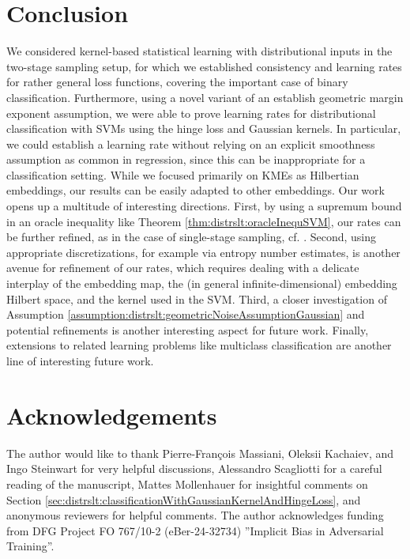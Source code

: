 \documentclass[letterpaper]{article} %
\begin{document}
\section{Conclusion}
We considered kernel-based statistical learning with distributional inputs in the two-stage sampling setup, for which we established consistency and learning rates for rather general loss functions, covering the important case of binary classification.
Furthermore, using a novel variant of an establish geometric margin exponent assumption, we were able to prove learning rates for distributional classification with SVMs using the hinge loss and Gaussian kernels. 
In particular, we could establish a learning rate without relying on an explicit smoothness assumption as common in regression, since this can be inappropriate for a classification setting.
While we focused primarily on KMEs as Hilbertian embeddings, our results can be easily adapted to other embeddings.
Our work opens up a multitude of interesting directions.
First, by using a supremum bound in an oracle inequality like Theorem \ref{thm:distrslt:oracleInequSVM}, our rates can be further refined, as in the case of single-stage sampling, cf. \cite[Chapter~7]{SC08}.
Second, using appropriate discretizations, for example via entropy number estimates, is another avenue for refinement of our rates, which requires dealing with a delicate interplay of the embedding map, the (in general infinite-dimensional) embedding Hilbert space, and the kernel used in the SVM.
Third, a closer investigation of Assumption \ref{assumption:distrslt:geometricNoiseAssumptionGaussian} and potential refinements is another interesting aspect for future work.
Finally, extensions to related learning problems like multiclass classification are another line of interesting future work.
\clearpage

\onecolumn

\section*{Acknowledgements}
The author would like to thank Pierre-François Massiani, Oleksii Kachaiev, and Ingo Steinwart for very helpful discussions, Alessandro Scagliotti for a careful reading of the manuscript, Mattes Mollenhauer for insightful comments on Section \ref{sec:distrslt:classificationWithGaussianKernelAndHingeLoss}, and anonymous reviewers for helpful comments. 
The author acknowledges funding from DFG Project FO 767/10-2 (eBer-24-32734) ”Implicit Bias in Adversarial Training”.
  
\end{document}
